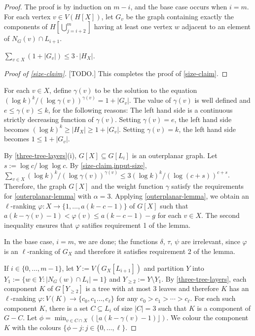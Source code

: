 \documentclass[kpfonts]{patmorin}
\theoremstyle{named}
\begin{document}
\begin{proof}
    The proof is by induction on $m-i$, and the base case occurs when $i=m$.  For each vertex $v\in V(H[X])$, let $G_v$ be the graph containing exactly the components of $H[\bigcup_{j=i+2}^m]$ having at least one vertex $w$ adjacent to an element of $N_G(v)\cap L_{i+1}$.

    \begin{clm}\label{size-claim}
        $\sum_{v\in X}(1+|G_v|) \le 3\cdot |H_X|$.
    \end{clm}

    \begin{proof}[Proof of \cref{size-claim}]
        [TODO.] This completes the proof of \cref{size-claim}.
    \end{proof}

    For each $v\in X$, define $\gamma(v)$ to be the solution to the equation $(\log k)^k/(\log\gamma(v))^{\gamma(v)}=1+|G_v|$.  The value of $\gamma(v)$ is well defined and $e\le \gamma(v)\le k$, for the following reasons:  The left hand side is a continuous strictly decreasing function of $\gamma(v)$. Setting $\gamma(v)=e$, the left hand side becomes $(\log k)^k \ge |H_X|\ge 1+|G_v|$. Setting $\gamma(v)=k$, the left hand side becomes $1\le 1+|G_v|$.

    By \cref{three-tree-layers}(i), $G[X]\subseteq G[L_i]$ is an outerplanar graph. Let $s:=\log c/\log\log c$. By \cref{size-claim,input-size}, $\sum_{v\in X}(\log k)^k/(\log\gamma(v))^{\gamma(v)} \le 3(\log k)^k/(\log(c+s))^{c+s}$.  Therefore, the graph $G[X]$ and the weight function $\gamma$ satisfy the requirements for \cref{outerplanar-lemma} with $\alpha =3$. Applying \cref{outerplanar-lemma}, we obtain an $\ell$-ranking  $\varphi:X\to\{1,\ldots,a(k-c-1)\}$ of $G[X]$ such that
    $a(k-\gamma(v)-1) < \varphi(v) \le a(k-c-1)-g$ for each $v\in X$.  The second inequality ensures that $\varphi$ satifies requirement 1 of the lemma.

    In the base case, $i=m$, we are done; the functions $\delta$, $\tau$, $\psi$ are irrelevant, since $\varphi$ is an $\ell$-ranking of $G_X$ and therefore it satisfies requirement 2 of the lemma.

    If $i\in\{0,\ldots,m-1\}$, let $Y:=V(G_X[L_{i+1}])$ and partition $Y$ into $Y_1:=\{w\in Y:|N_G(w)\cap L_{i}|=1\}$ and $Y_{\ge 2}:=Y\setminus Y_1$.  By \cref{three-tree-layers}, each component $K$ of $G[Y_{\ge 2}]$ is a tree with at most 3 leaves and therefore $K$ has an $\ell$-ranking $\varphi:V(K)\to\{c_0,c_1\ldots,c_{\ell}\}$ for any $c_0>c_1>\cdots>c_{\ell}$.  For each such component $K$, there is a set $C\subseteq L_i$ of size $|C|=3$ such that $K$ is a component of $G-C$.  Let $\phi=\min_{v\in C\cap X}(\lfloor a(k-\gamma(v)-1)\rfloor)$.  We colour the component $K$ with the colours $\{\phi-j: j\in\{0,\ldots,\ell\}$.


\end{proof}
\end{document}
